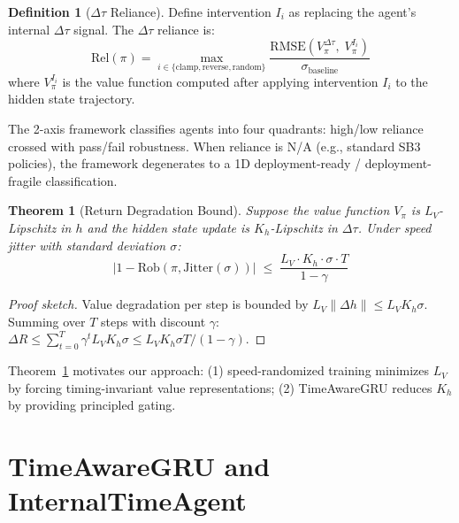 \documentclass[10pt,twocolumn]{article}
\newcommand{\deltatau}{\Delta\tau}
\newcommand{\Rob}{\mathrm{Rob}}
\newcommand{\Rel}{\mathrm{Rel}}
\newcommand{\RMSE}{\mathrm{RMSE}}
\theoremstyle{plain}
\newtheorem{theorem}{Theorem}
\theoremstyle{definition}
\newtheorem{definition}{Definition}
\begin{document}
\begin{definition}[$\deltatau$ Reliance]
\label{def:reliance}
Define intervention $I_i$ as replacing the agent's internal $\deltatau$ signal.
The $\deltatau$ reliance is:
\begin{equation}
  \Rel(\pi) = \max_{i \in \{\text{clamp}, \text{reverse}, \text{random}\}}
    \frac{\RMSE(V_\pi^{\deltatau},\; V_\pi^{I_i})}{\sigma_{\text{baseline}}}
  \label{eq:reliance}
\end{equation}
where $V_\pi^{I_i}$ is the value function computed after applying intervention $I_i$
to the hidden state trajectory.
\end{definition}

The 2-axis framework classifies agents into four quadrants:
high/low reliance crossed with pass/fail robustness. When reliance is N/A
(e.g., standard SB3 policies), the framework degenerates to a 1D
deployment-ready / deployment-fragile classification.

\begin{theorem}[Return Degradation Bound]
\label{thm:lipschitz}
Suppose the value function $V_\pi$ is $L_V$-Lipschitz in $h$ and the hidden state
update is $K_h$-Lipschitz in $\deltatau$.
Under speed jitter with standard deviation $\sigma$:
\begin{equation}
  \bigl|1 - \Rob(\pi, \mathrm{Jitter}(\sigma))\bigr|
  \;\leq\; \frac{L_V \cdot K_h \cdot \sigma \cdot T}{1 - \gamma}
  \label{eq:bound}
\end{equation}
\end{theorem}

\begin{proof}[Proof sketch]
Value degradation per step is bounded by $L_V \|{\Delta h}\| \leq L_V K_h \sigma$.
Summing over $T$ steps with discount $\gamma$:
$\Delta R \leq \sum_{t=0}^T \gamma^t L_V K_h \sigma \leq L_V K_h \sigma T/(1-\gamma)$.
\end{proof}

Theorem~\ref{thm:lipschitz} motivates our approach: (1) speed-randomized training
minimizes $L_V$ by forcing timing-invariant value representations; (2) TimeAwareGRU
reduces $K_h$ by providing principled gating.

\section{TimeAwareGRU and InternalTimeAgent}
\label{sec:model}
\end{document}
